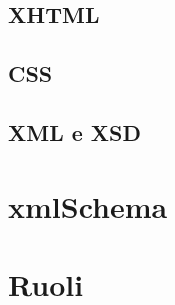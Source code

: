 \documentclass[12pt]{article}
\begin{document}
	\subsection{XHTML}
	\subsection{CSS}
	\subsection{XML e XSD}

\section{xmlSchema}



\section{Ruoli}

	


\newpage
\end{document}

